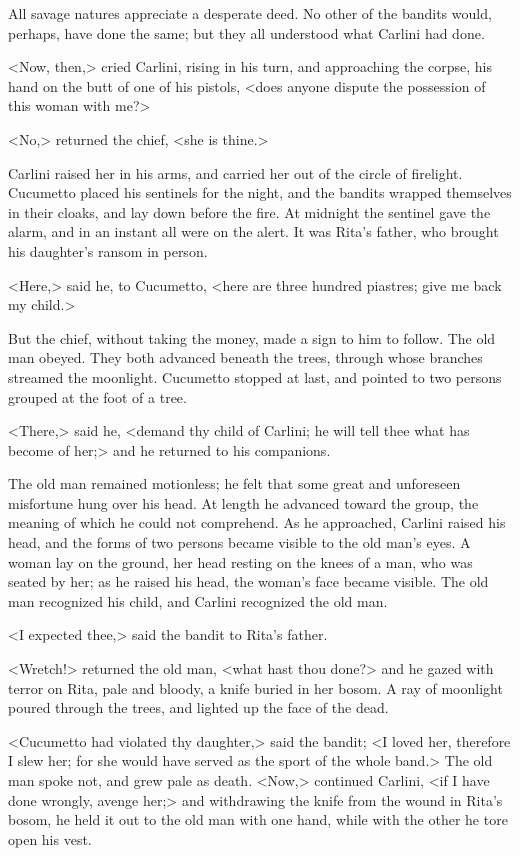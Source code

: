 {All savage natures appreciate a desperate deed. No other of the bandits would, perhaps, have done the same; but they all understood what Carlini had done. 

<Now, then,> cried Carlini, rising in his turn, and approaching the corpse, his hand on the butt of one of his pistols, <does anyone dispute the possession of this woman with me?> 

<No,> returned the chief, <she is thine.> 

Carlini raised her in his arms, and carried her out of the circle of firelight. Cucumetto placed his sentinels for the night, and the bandits wrapped themselves in their cloaks, and lay down before the fire. At midnight the sentinel gave the alarm, and in an instant all were on the alert. It was Rita's father, who brought his daughter's ransom in person. 

 <Here,> said he, to Cucumetto, <here are three hundred piastres; give me back my child.> 

But the chief, without taking the money, made a sign to him to follow. The old man obeyed. They both advanced beneath the trees, through whose branches streamed the moonlight. Cucumetto stopped at last, and pointed to two persons grouped at the foot of a tree. 

<There,> said he, <demand thy child of Carlini; he will tell thee what has become of her;> and he returned to his companions. 

The old man remained motionless; he felt that some great and unforeseen misfortune hung over his head. At length he advanced toward the group, the meaning of which he could not comprehend. As he approached, Carlini raised his head, and the forms of two persons became visible to the old man's eyes. A woman lay on the ground, her head resting on the knees of a man, who was seated by her; as he raised his head, the woman's face became visible. The old man recognized his child, and Carlini recognized the old man. 

<I expected thee,> said the bandit to Rita's father. 

<Wretch!> returned the old man, <what hast thou done?> and he gazed with terror on Rita, pale and bloody, a knife buried in her bosom. A ray of moonlight poured through the trees, and lighted up the face of the dead. 

<Cucumetto had violated thy daughter,> said the bandit; <I loved her, therefore I slew her; for she would have served as the sport of the whole band.> The old man spoke not, and grew pale as death. <Now,> continued Carlini, <if I have done wrongly, avenge her;> and withdrawing the knife from the wound in Rita's bosom, he held it out to the old man with one hand, while with the other he tore open his vest. 

}
